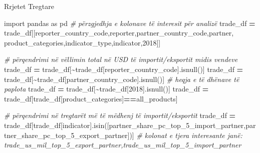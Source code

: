 \documentclass[
  ignorenonframetext,
]{beamer}
\newenvironment{Shaded}{\begin{snugshade}}{\end{snugshade}}
\newcommand{\CommentTok}[1]{\textcolor[rgb]{0.56,0.35,0.01}{\textit{#1}}}
\newcommand{\ImportTok}[1]{#1}
\newcommand{\NormalTok}[1]{#1}
\newcommand{\OperatorTok}[1]{\textcolor[rgb]{0.81,0.36,0.00}{\textbf{#1}}}
\newcommand{\StringTok}[1]{\textcolor[rgb]{0.31,0.60,0.02}{#1}}
\begin{document}
\begin{frame}[fragile]{Rrjetet Tregtare}
\protect\hypertarget{rrjetet-tregtare-4}{}

\begin{Shaded}
\begin{Highlighting}[]
\ImportTok{import}\NormalTok{ pandas }\ImportTok{as}\NormalTok{ pd}
\CommentTok{\# përzgjedhja e kolonave të interesit për analizë}
\NormalTok{trade\_df }\OperatorTok{=}\NormalTok{ trade\_df[[}\StringTok{\textquotesingle{}reporter\_country\_code\textquotesingle{}}\NormalTok{,}\StringTok{\textquotesingle{}reporter\textquotesingle{}}\NormalTok{,}\StringTok{\textquotesingle{}partner\_country\_code\textquotesingle{}}\NormalTok{,}\StringTok{\textquotesingle{}partner\textquotesingle{}}\NormalTok{,}
                     \StringTok{\textquotesingle{}product\_categories\textquotesingle{}}\NormalTok{,}\StringTok{\textquotesingle{}indicator\_type\textquotesingle{}}\NormalTok{,}\StringTok{\textquotesingle{}indicator\textquotesingle{}}\NormalTok{,}\StringTok{\textquotesingle{}2018\textquotesingle{}}\NormalTok{]]}

\CommentTok{\# përqendrimi në vëllimin total në USD të importit/eksportit midis vendeve}
\NormalTok{trade\_df }\OperatorTok{=}\NormalTok{ trade\_df[}\OperatorTok{\textasciitilde{}}\NormalTok{trade\_df[}\StringTok{\textquotesingle{}reporter\_country\_code\textquotesingle{}}\NormalTok{].isnull()]}
\NormalTok{trade\_df }\OperatorTok{=}\NormalTok{ trade\_df[}\OperatorTok{\textasciitilde{}}\NormalTok{trade\_df[}\StringTok{\textquotesingle{}partner\_country\_code\textquotesingle{}}\NormalTok{].isnull()]}
\CommentTok{\# heqja e të dhënave të paplota}
\NormalTok{trade\_df }\OperatorTok{=}\NormalTok{ trade\_df[}\OperatorTok{\textasciitilde{}}\NormalTok{trade\_df[}\StringTok{\textquotesingle{}2018\textquotesingle{}}\NormalTok{].isnull()]}
\NormalTok{trade\_df }\OperatorTok{=}\NormalTok{ trade\_df[trade\_df[}\StringTok{\textquotesingle{}product\_categories\textquotesingle{}}\NormalTok{]}\OperatorTok{==}\StringTok{\textquotesingle{}all\_products\textquotesingle{}}\NormalTok{]}

\CommentTok{\# përqendrimi në tregtarët më të mëdhenj të importit/eksportit}
\NormalTok{trade\_df }\OperatorTok{=}\NormalTok{ trade\_df[trade\_df[}\StringTok{\textquotesingle{}indicator\textquotesingle{}}\NormalTok{].isin([}\StringTok{\textquotesingle{}partner\_share\_pc\_top\_5\_import\_partner\textquotesingle{}}\NormalTok{,}\StringTok{\textquotesingle{}partner\_share\_pc\_top\_5\_export\_partner\textquotesingle{}}\NormalTok{])]}
\CommentTok{\# kolonat e tjera interesante janë: \textquotesingle{}trade\_us\_mil\_top\_5\_export\_partner\textquotesingle{},\textquotesingle{}trade\_us\_mil\_top\_5\_import\_partner\textquotesingle{}}
\end{Highlighting}
\end{Shaded}
\end{frame}
\end{document}
